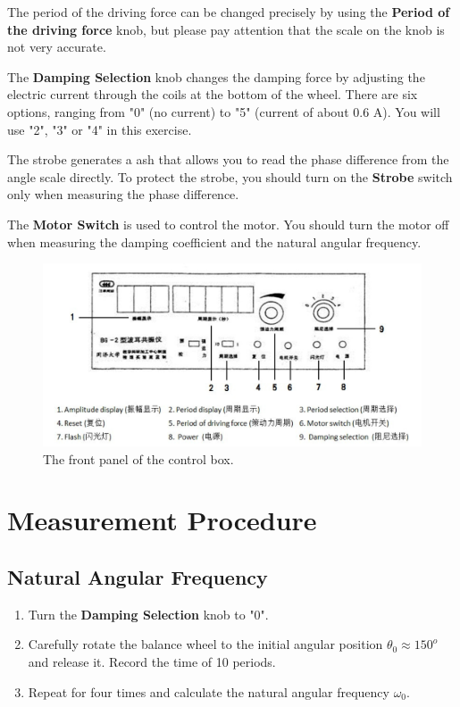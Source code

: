 \documentclass[12pt]{article}
\begin{document}
\par The period of the driving force can be changed precisely by using the \textbf{Period of the driving force} knob, but please pay attention that the scale on the knob is not very accurate.
\par The \textbf{Damping Selection} knob changes the damping force by adjusting the electric current through the coils at the bottom of the wheel. There are six options, ranging from "0" (no current) to "5" (current of about 0.6 A). You will use "2", "3" or "4" in this exercise.
\par The strobe generates a ash that allows you to read the phase difference from the
angle scale directly. To protect the strobe, you should turn on the \textbf{Strobe} switch only when measuring the phase difference. 
\par The \textbf{Motor Switch} is used to control the motor. You should turn the motor off when measuring the damping coefficient and the natural angular frequency.
\begin{figure}[H]
\centering
\includegraphics[scale=0.5]{P3.jpg}
\caption{The front panel of the control box.}
\end{figure}
\section{Measurement Procedure}
\subsection{Natural Angular Frequency}
\begin{enumerate}
\item Turn the \textbf{Damping Selection} knob to "0".
\item Carefully rotate the balance wheel to the initial angular position $\theta_0\approx 150^o$ and
release it. Record the time of 10 periods.
\item Repeat for four times and calculate the natural angular frequency $\omega_0$.
\end{enumerate}
\end{document}
